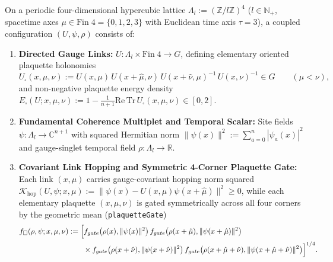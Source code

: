 On a periodic four-dimensional hypercubic lattice $\Lambda_l := (\mathbb{Z}/l\mathbb{Z})^4$ ($l \in \mathbb{N}_+$, spacetime axes $\mu \in \mathrm{Fin}\;4 = \{0,1,2,3\}$ with Euclidean time axis $\tau = 3$), a coupled configuration $(U, \psi, \rho)$ consists of:
\begin{enumerate}[leftmargin=2em]
  \item \textbf{Directed Gauge Links:} $U : \Lambda_l \times \mathrm{Fin}\;4 \to G$, defining elementary oriented plaquette holonomies
  \begin{equation}
  U_\square(x,\mu,\nu) := U(x,\mu)\,U(x+\hat{\mu},\nu)\,U(x+\hat{\nu},\mu)^{-1}\,U(x,\nu)^{-1} \in G
  \qquad (\mu < \nu),
  \label{eq:plaquette_def_stage4}
  \end{equation}
  and non-negative plaquette energy density $E_\square(U; x,\mu,\nu) := 1 - \frac{1}{n+1}\mathrm{Re}\,\mathrm{Tr}\,U_\square(x,\mu,\nu) \in [0, 2]$.
  \item \textbf{Fundamental Coherence Multiplet and Temporal Scalar:} Site fields $\psi : \Lambda_l \to \mathbb{C}^{n+1}$ with squared Hermitian norm $\|\psi(x)\|^2 := \sum_{a=0}^n |\psi_a(x)|^2$ and gauge-singlet temporal field $\rho : \Lambda_l \to \mathbb{R}$.
  \item \textbf{Covariant Link Hopping and Symmetric 4-Corner Plaquette Gate:} Each link $(x,\mu)$ carries gauge-covariant hopping norm squared $\mathcal{K}_{\mathrm{hop}}(U,\psi;x,\mu) := \|\psi(x) - U(x,\mu)\psi(x+\hat{\mu})\|^2 \ge 0$, while each elementary plaquette $(x,\mu,\nu)$ is gated symmetrically across all four corners by the geometric mean (\texttt{plaquetteGate})
  \begin{equation}
  \begin{aligned}
  f_\square(\rho,\psi; x,\mu,\nu) &:= \Bigl[
    f_{\mathrm{gate}}\bigl(\rho(x),\|\psi(x)\|^2\bigr)\,
    f_{\mathrm{gate}}\bigl(\rho(x+\hat{\mu}),\|\psi(x+\hat{\mu})\|^2\bigr)\\
  &\qquad\times
    f_{\mathrm{gate}}\bigl(\rho(x+\hat{\nu}),\|\psi(x+\hat{\nu})\|^2\bigr)\,
    f_{\mathrm{gate}}\bigl(\rho(x+\hat{\mu}+\hat{\nu}),\|\psi(x+\hat{\mu}+\hat{\nu})\|^2\bigr)
  \Bigr]^{1/4}.
  \end{aligned}
  \label{eq:four_corner_plaquette_gate}
  \end{equation}
\end{enumerate}

